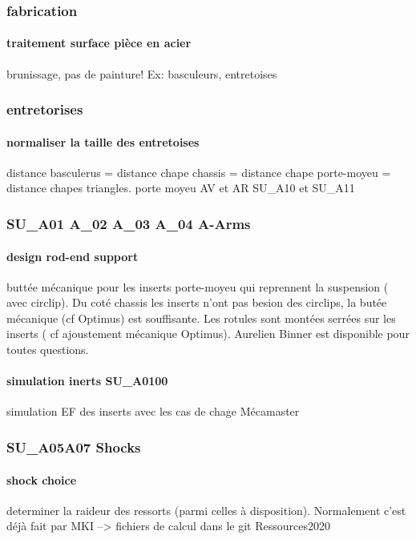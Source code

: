 		\subsubsection*{fabrication} 
 \par 
			\paragraph{traitement surface pièce en acier} brunissage, pas de painture! Ex: basculeurs, entretoises
		\subsubsection*{entretorises} 
 \par 
			\paragraph{normaliser la taille des entretoises} distance basculerus = distance chape chassis = distance chape porte-moyeu = distance chapes triangles. porte moyeu AV et AR SU\_A10 et SU\_A11
		\subsubsection*{SU\_A01 A\_02 A\_03 A\_04 A-Arms} 
 \par 
			\paragraph{design rod-end support} buttée mécanique pour les inserts porte-moyeu qui reprennent la suspension ( avec circlip). Du coté chassis les inserts n'ont pas besion des circlips, la butée mécanique (cf Optimus) est souffisante. Les rotules sont montées serrées sur les inserts ( cf ajoustement mécanique Optimus). Aurelien Binner est disponible pour toutes questions.
			\paragraph{simulation inerts SU\_A0100} simulation EF des inserts avec les cas de chage Mécamaster
		\subsubsection*{SU\_A05A07 Shocks} 
 \par 
			\paragraph{shock choice} determiner la raideur des ressorts (parmi celles à disposition). Normalement c'est déjà fait par MKI --> fichiers de calcul dans le git Ressources2020 
